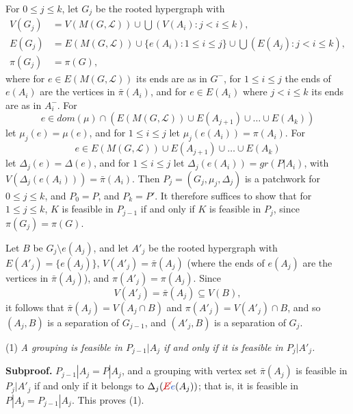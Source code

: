 For $0 \le j \le k$, let $G_j$ be the rooted hypergraph with
\begin{align*}
V(G_j) &= V(M(G, \mathscr{L})) \cup \bigcup (V(A_i) \colon j < i \le k), \\
E(G_j) &= E(M(G, \mathscr{L})) \cup \{e(A_i) \colon 1 \le i \le j\} \cup \bigcup (E(A_j) \colon j < i \le k), \\
\pi(G_j) &= \pi(G),
\end{align*}
where for $e \in E(M(G, \mathscr{L}))$ its ends are as in $G^-$, for $1 \le i \le j$ the ends of $e(A_i)$ are the vertices in $\bar{\pi}(A_i)$, and for $e \in E(A_i)$ where $j < i \le k$ its ends are as in $A_i^-$. For
\begin{equation*}
e \in dom(\mu) \cap (E(M(G, \mathscr{L})) \cup E(A_{j+1}) \cup \dots \cup E(A_k))
\end{equation*}
let $\mu_j(e) = \mu(e)$, and for $1 \le i \le j$ let $\mu_j(e(A_i)) = \pi(A_i)$. For
\begin{equation*}
e \in E(M(G, \mathscr{L})) \cup E(A_{j+1}) \cup \dots \cup E(A_k)
\end{equation*}
let $\Delta_j(e) = \Delta(e)$, and for $1 \le i \le j$ let $\Delta_j(e(A_i)) = gr(P|A_i)$, with $V(\Delta_j(e(A_i))) = \bar{\pi}(A_i)$. Then $P_j = (G_j, \mu_j, \Delta_j)$ is a patchwork for $0 \le j \le k$, and $P_0 = P$, and $P_k = P'$. It therefore suffices to show that for $1 \le j \le k$, $K$ is feasible in $P_{j-1}$ if and only if $K$ is feasible in $P_j$, since $\pi(G_j) = \pi(G)$.

Let $B$ be $G_j \setminus e(A_j)$, and let $A'_j$ be the rooted hypergraph with $E(A'_j) = \{e(A_j)\}$, $V(A'_j) = \bar{\pi}(A_j)$ (where the ends of $e(A_j)$ are the vertices in $\bar{\pi}(A_j)$), and $\pi(A'_j) = \pi(A_j)$. Since
\begin{equation*}
V(A'_j) = \bar{\pi}(A_j) \subseteq V(B),
\end{equation*}
it follows that $\bar{\pi}(A_j) = V(A_j \cap B)$ and $\pi(A'_j) = V(A'_j) \cap B$, and so $(A_j, B)$ is a separation of $G_{j-1}$, and $(A'_j, B)$ is a separation of $G_j$.

\hspace*{12pt}(1) \textit{A grouping is feasible in $P_{j-1} | A_j$ if and only if it is feasible in $P_j | A'_j$.}

\textbf{Subproof.} $P_{j-1} | A_j = P | A_j$, and a grouping with vertex set $\bar{\pi}(A_j)$ is feasible in $P_j | A'_j$ if and only if it belongs to $\Delta_j(\delm{E}\fix{e}(A_j))$; that is, it is feasible in $P | A_j = P_{j-1} | A_j$. This proves (1).

